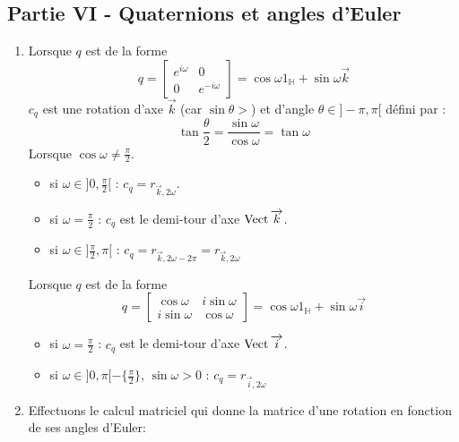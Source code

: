 \subsection*{Partie VI - Quaternions et angles d'Euler}
\begin{enumerate}
 \item Lorsque $q$ est de la forme 
\begin{displaymath}
 q = \begin{bmatrix}
e^{i\omega} & 0 \\
0 & e^{-i\omega}
     \end{bmatrix}
=\cos \omega 1_{\mathbb H} + \sin \omega \overrightarrow k
\end{displaymath}
$c_q$ est une rotation d'axe $\overrightarrow k$ (car $\sin \theta >$) et d'angle $\theta\in]-\pi,\pi[$ défini par :
\begin{displaymath}
 \tan \frac{\theta}{2} = \dfrac{\sin \omega}{\cos \omega} = \tan \omega
\end{displaymath}
Lorsque $\cos \omega \neq \frac{\pi}{2}$.
\begin{itemize}
 \item si $\omega \in ]0,\frac{\pi}{2}[$ : $c_q = r_{\overrightarrow k , 2\omega}$.
\item  si $\omega = \frac{\pi}{2}$ : $c_q$ est le demi-tour d'axe $\operatorname{Vect} \overrightarrow k$.
\item si $\omega \in ]\frac{\pi}{2}, \pi[$ : $c_q = r_{\overrightarrow k , 2\omega -2\pi}=r_{\overrightarrow k , 2\omega}$
\end{itemize}
Lorsque $q$ est de la forme
\begin{displaymath}
 q= \begin{bmatrix}
\cos \omega & i\sin \omega \\
i\sin \omega & \cos \omega
    \end{bmatrix}
=\cos \omega 1_{\mathbb H} + \sin \omega \overrightarrow i
\end{displaymath}
\begin{itemize}
\item  si $\omega = \frac{\pi}{2}$ : $c_q$ est le demi-tour d'axe $\operatorname{Vect} \overrightarrow i$.
\item si $\omega \in ]0,\pi[-\{\frac{\pi}{2}\}$, $\sin \omega >0$ : $c_q = r_{\overrightarrow i , 2\omega}$
\end{itemize}
\item Effectuons le calcul matriciel qui donne la matrice d'une rotation en fonction de ses angles d'Euler:
\begin{multline*}

\end{multline*}
\end{enumerate}
